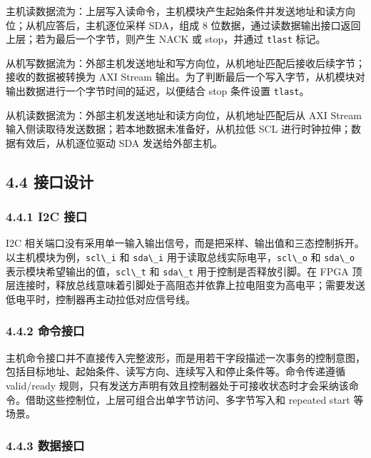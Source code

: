 主机读数据流为：上层写入读命令，主机模块产生起始条件并发送地址和读方向位；从机应答后，主机逐位采样
SDA，组成 8 位数据，通过读数据输出接口返回上层；若为最后一个字节，则产生
NACK 或 stop，并通过 \passthrough{\lstinline!tlast!} 标记。

从机写数据流为：外部主机发送地址和写方向位，从机地址匹配后接收后续字节；接收的数据被转换为
AXI Stream
输出。为了判断最后一个写入字节，从机模块对输出数据进行一个字节时间的延迟，以便结合
stop 条件设置 \passthrough{\lstinline!tlast!}。

从机读数据流为：外部主机发送地址和读方向位，从机地址匹配后从 AXI Stream
输入侧读取待发送数据；若本地数据未准备好，从机拉低 SCL
进行时钟拉伸；数据有效后，从机逐位驱动 SDA 发送给外部主机。

\subsection{4.4 接口设计}\label{ux63a5ux53e3ux8bbeux8ba1}

\subsubsection{4.4.1 I2C 接口}\label{i2c-ux63a5ux53e3}

I2C
相关端口没有采用单一输入输出信号，而是把采样、输出值和三态控制拆开。以主机模块为例，\passthrough{\lstinline!scl\_i!}
和 \passthrough{\lstinline!sda\_i!}
用于读取总线实际电平，\passthrough{\lstinline!scl\_o!} 和
\passthrough{\lstinline!sda\_o!}
表示模块希望输出的值，\passthrough{\lstinline!scl\_t!} 和
\passthrough{\lstinline!sda\_t!} 用于控制是否释放引脚。在 FPGA
顶层连接时，释放总线意味着引脚处于高阻态并依靠上拉电阻变为高电平；需要发送低电平时，控制器再主动拉低对应信号线。

\subsubsection{4.4.2 命令接口}\label{ux547dux4ee4ux63a5ux53e3}

主机命令接口并不直接传入完整波形，而是用若干字段描述一次事务的控制意图，包括目标地址、起始条件、读写方向、连续写入和停止条件等。命令传递遵循
valid/ready
规则，只有发送方声明有效且控制器处于可接收状态时才会采纳该命令。借助这些控制位，上层可组合出单字节访问、多字节写入和
repeated start 等场景。

\subsubsection{4.4.3 数据接口}\label{ux6570ux636eux63a5ux53e3}

